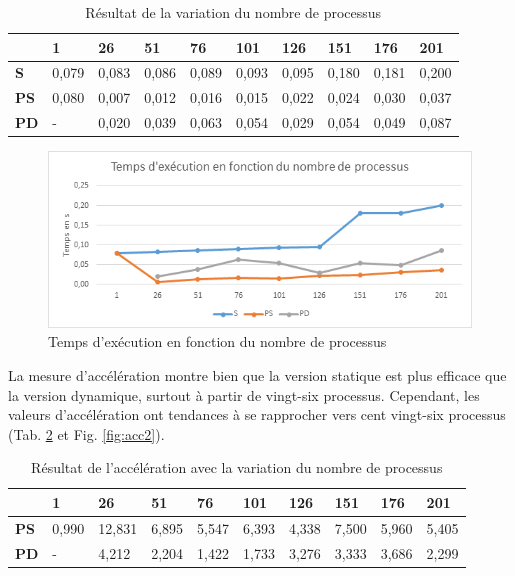 \documentclass[a4paper,12pt]{article}
\begin{document}
\begin{table}[H]
\caption{Résultat de la variation du nombre de processus}
\label{tab:tempsexec2}
\begin{tabular}{|l|l|l|l|l|l|l|l|l|l|}
\hline
            & \textbf{1} & \textbf{26} & \textbf{51} & \textbf{76} & \textbf{101} & \textbf{126} & \textbf{151} & \textbf{176} & \textbf{201} \\ \hline
\textbf{S}  & 0,079      & 0,083       & 0,086       & 0,089       & 0,093        & 0,095        & 0,180        & 0,181        & 0,200        \\ \hline
\textbf{PS} & 0,080      & 0,007       & 0,012       & 0,016       & 0,015        & 0,022        & 0,024        & 0,030        & 0,037        \\ \hline
\textbf{PD} & -          & 0,020       & 0,039       & 0,063       & 0,054        & 0,029        & 0,054        & 0,049        & 0,087        \\ \hline
\end{tabular}
\end{table}

\begin{figure}[H]
\center \includegraphics[width=15cm]{exec2}
\caption{Temps d'exécution en fonction du nombre de processus}
\label{fig:tempsexec2}
\end{figure}

La mesure d'accélération montre bien que la version statique est plus efficace que la version dynamique, surtout à partir de vingt-six processus. Cependant, les valeurs d'accélération ont tendances à se rapprocher vers cent vingt-six processus (Tab. \ref{tab:acc2} et Fig. \ref{fig:acc2}).

\begin{table}[H]
\caption{Résultat de l'accélération avec la variation du nombre de processus}
\label{tab:acc2}
\begin{tabular}{|l|l|l|l|l|l|l|l|l|l|}
\hline
            & \textbf{1} & \textbf{26} & \textbf{51} & \textbf{76} & \textbf{101} & \textbf{126} & \textbf{151} & \textbf{176} & \textbf{201} \\ \hline
\textbf{PS} & 0,990      & 12,831      & 6,895       & 5,547       & 6,393        & 4,338        & 7,500        & 5,960        & 5,405        \\ \hline
\textbf{PD} & -          & 4,212       & 2,204       & 1,422       & 1,733        & 3,276        & 3,333        & 3,686        & 2,299        \\ \hline
\end{tabular}
\end{table}
\end{document}
